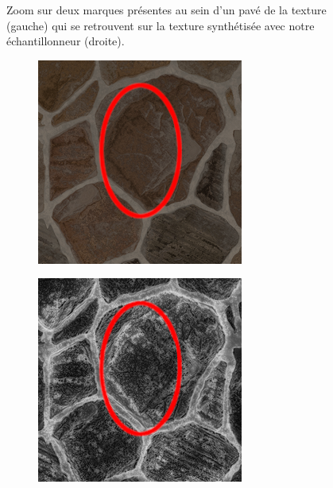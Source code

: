 \begin{figure}
    \caption[L'échantillonneur préserve partiellement les marques dans les pavés]{Zoom sur deux marques présentes au sein d'un pavé de la texture (gauche) qui se retrouvent sur la texture synthétisée avec notre échantillonneur (droite). }
    \label{fig:mark-preserved}
\end{figure}

\begin{figure}
    \centering
    \begin{subfigure}{.45\textwidth}
        \centering
        \includegraphics[width=\textwidth]{contenu/resources/images/stone_zoom}
    \end{subfigure}
    \hfill
    \begin{subfigure}{.45\textwidth}
        \centering
        \includegraphics[width=\textwidth]{contenu/resources/images/stone_zoom_pc}

\end{subfigure}
\end{figure}
